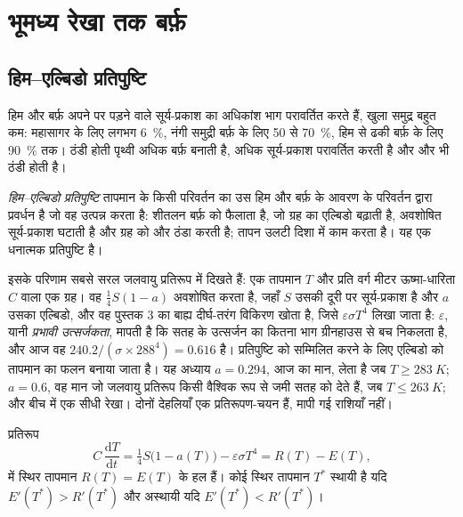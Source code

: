 \section{भूमध्य रेखा तक बर्फ़}\label{sec:b2:precambrian-earth:snowball}

\subsection*{हिम--एल्बिडो प्रतिपुष्टि}

हिम और बर्फ़ अपने पर पड़ने वाले सूर्य-प्रकाश का अधिकांश भाग परावर्तित करते हैं, खुला समुद्र बहुत कम: महासागर के लिए लगभग
\qty{6}{\percent}, नंगी समुद्री बर्फ़ के लिए 50 से \qty{70}{\percent}, हिम से ढकी बर्फ़ के लिए
\qty{90}{\percent} तक। ठंडी होती पृथ्वी अधिक बर्फ़ बनाती है, अधिक
सूर्य-प्रकाश परावर्तित करती है और और भी ठंडी होती है।

\begin{definition}[हिम--एल्बिडो प्रतिपुष्टि]\label{def:b2:precambrian-earth:ice-albedo}
\emph{हिम--एल्बिडो प्रतिपुष्टि} तापमान के किसी परिवर्तन का उस हिम और बर्फ़ के आवरण के परिवर्तन द्वारा
प्रवर्धन है जो वह उत्पन्न करता है: शीतलन बर्फ़ को फैलाता है, जो
ग्रह का एल्बिडो बढ़ाती है, अवशोषित सूर्य-प्रकाश घटाती है और ग्रह को और ठंडा करती है;
तापन उलटी दिशा में काम करता है। यह एक धनात्मक प्रतिपुष्टि है।
\end{definition}

इसके परिणाम सबसे सरल जलवायु प्रतिरूप में दिखते हैं: एक तापमान $T$ और प्रति वर्ग मीटर ऊष्मा-धारिता
$C$ वाला एक ग्रह। वह $\tfrac14 S(1 - a)$ अवशोषित करता है, जहाँ $S$ उसकी दूरी पर सूर्य-प्रकाश
है और $a$ उसका एल्बिडो, और वह पुस्तक 3 का बाह्य दीर्घ-तरंग विकिरण खोता है,
जिसे $\varepsilon\sigma T^4$ लिखा जाता है: $\varepsilon$, यानी \emph{प्रभावी उत्सर्जकता},
मापती है कि सतह के उत्सर्जन का कितना भाग ग्रीनहाउस से बच निकलता है, और आज वह
$240.2/(\sigma\times288^4) = 0.616$ है। प्रतिपुष्टि को सम्मिलित करने के लिए एल्बिडो को
तापमान का फलन बनाया जाता है। यह अध्याय $a = 0.294$, आज का मान, लेता है जब $T \ge \qty{283}{K}$; $a
= 0.6$, वह मान जो जलवायु प्रतिरूप किसी वैश्विक रूप से जमी सतह को देते हैं, जब $T \le \qty{263}{K}$; और
बीच में एक सीधी रेखा। दोनों देहलियाँ एक प्रतिरूपण-चयन हैं, मापी गई
राशियाँ नहीं।

\begin{proposition}[ऊर्जा-संतुलन प्रतिरूप के साम्य]\label{prop:b2:precambrian-earth:ebm}
प्रतिरूप
\[
  C\,\frac{\mathrm dT}{\mathrm dt} = \tfrac14 S\bigl(1 - a(T)\bigr) - \varepsilon\sigma T^4
  = R(T) - E(T),
\]
में स्थिर तापमान $R(T) = E(T)$ के हल हैं। कोई स्थिर तापमान $T^*$
स्थायी है यदि $E'(T^*) > R'(T^*)$ और अस्थायी यदि $E'(T^*) < R'(T^*)$।
\end{proposition}

